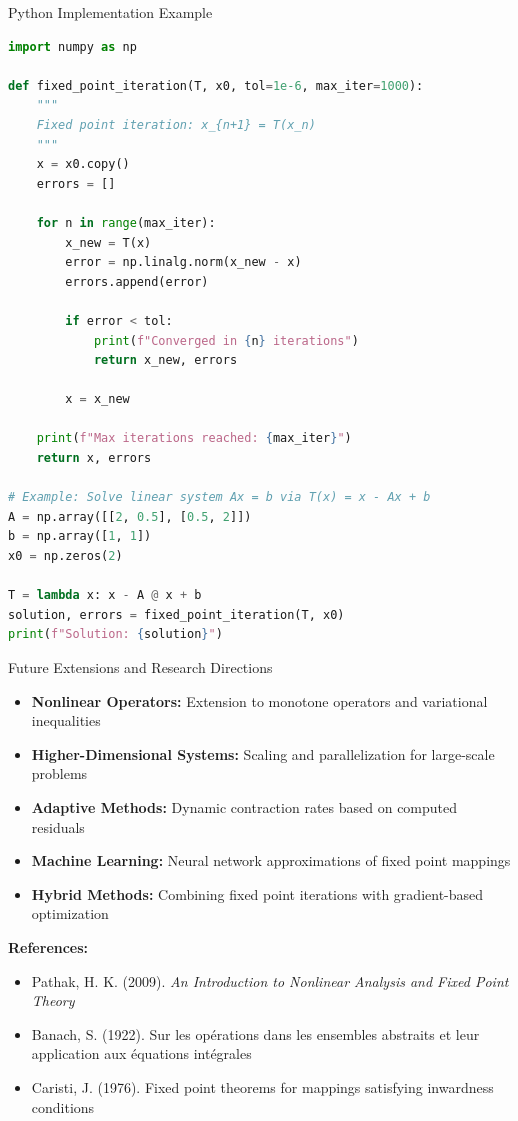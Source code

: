 \documentclass[aspectratio=169,10pt]{beamer}
\begin{document}
\begin{frame}[fragile]{Python Implementation Example}
    \begin{lstlisting}[language=Python, basicstyle=\ttfamily\tiny]
import numpy as np

def fixed_point_iteration(T, x0, tol=1e-6, max_iter=1000):
    """
    Fixed point iteration: x_{n+1} = T(x_n)
    """
    x = x0.copy()
    errors = []

    for n in range(max_iter):
        x_new = T(x)
        error = np.linalg.norm(x_new - x)
        errors.append(error)

        if error < tol:
            print(f"Converged in {n} iterations")
            return x_new, errors

        x = x_new

    print(f"Max iterations reached: {max_iter}")
    return x, errors

# Example: Solve linear system Ax = b via T(x) = x - Ax + b
A = np.array([[2, 0.5], [0.5, 2]])
b = np.array([1, 1])
x0 = np.zeros(2)

T = lambda x: x - A @ x + b
solution, errors = fixed_point_iteration(T, x0)
print(f"Solution: {solution}")
    \end{lstlisting}
\end{frame}

\begin{frame}{Future Extensions and Research Directions}
    \begin{itemize}
        \item \textbf{Nonlinear Operators:} Extension to monotone operators and variational inequalities
        \item \textbf{Higher-Dimensional Systems:} Scaling and parallelization for large-scale problems
        \item \textbf{Adaptive Methods:} Dynamic contraction rates based on computed residuals
        \item \textbf{Machine Learning:} Neural network approximations of fixed point mappings
        \item \textbf{Hybrid Methods:} Combining fixed point iterations with gradient-based optimization
    \end{itemize}

    \vspace{0.5cm}

    \textbf{References:}
    \begin{itemize}
        \item Pathak, H. K. (2009). \textit{An Introduction to Nonlinear Analysis and Fixed Point Theory}
        \item Banach, S. (1922). Sur les opérations dans les ensembles abstraits et leur application aux équations intégrales
        \item Caristi, J. (1976). Fixed point theorems for mappings satisfying inwardness conditions
    \end{itemize}
\end{frame}
\end{document}

